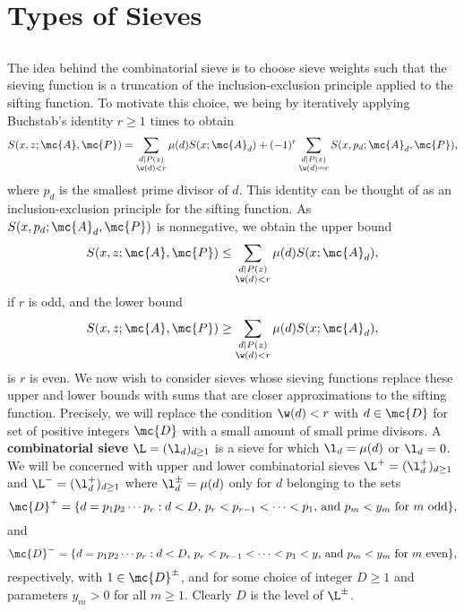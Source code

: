 \chapter{Types of Sieves}
  \section{}
    The idea behind the combinatorial sieve is to choose sieve weights such that the sieving function is a truncation of the inclusion-exclusion principle applied to the sifting function. To motivate this choice, we being by iteratively applying Buchstab's identity $r \ge 1$ times to obtain
    \[
      S(x,z;\mc{A},\mc{P}) = \sum_{\substack{d \mid P(z) \\ \w(d) < r}}\mu(d)S(x;\mc{A}_{d})+(-1)^{r}\sum_{\substack{d \mid P(z) \\ \w(d) = r}}S(x,p_{d};\mc{A}_{d},\mc{P}),
    \]
    where $p_{d}$ is the smallest prime divisor of $d$. This identity can be thought of as an inclusion-exclusion principle for the sifting function. As $S(x,p_{d};\mc{A}_{d},\mc{P})$ is nonnegative, we obtain the upper bound
    \[
      S(x,z;\mc{A},\mc{P}) \le \sum_{\substack{d \mid P(z) \\ \w(d) < r}}\mu(d)S(x;\mc{A}_{d}),
    \]
    if $r$ is odd, and the lower bound
    \[
      S(x,z;\mc{A},\mc{P}) \ge \sum_{\substack{d \mid P(z) \\ \w(d) < r}}\mu(d)S(x;\mc{A}_{d}),
    \]
    is $r$ is even. We now wish to consider sieves whose sieving functions replace these upper and lower bounds with sums that are closer approximations to the sifting function. Precisely, we will replace the condition $\w(d) < r$ with $d \in \mc{D}$ for set of positive integers $\mc{D}$ with a small amount of small prime divisors. A \textbf{combinatorial sieve} $\L = (\l_{d})_{d \ge 1}$ is a sieve for which $\l_{d} = \mu(d)$ or $\l_{d} = 0$. We will be concerned with upper and lower combinatorial sieves $\L^{+} = (\l_{d}^{+})_{d \ge 1}$ and $\L^{-} = (\l_{d}^{+})_{d \ge 1}$ where $\l_{d}^{\pm} = \mu(d)$ only for $d$ belonging to the sets
    \[
      \mc{D}^{+} = \{d = p_{1}p_{2} \cdots p_{r}:\text{$d < D$, $p_{r} < p_{r-1} < \cdots < p_{1}$, and $p_{m} < y_{m}$ for $m$ odd}\},
    \]
    and
    \[
      \mc{D}^{-} = \{d = p_{1}p_{2} \cdots p_{r}:\text{$d < D$, $p_{r} < p_{r-1} < \cdots < p_{1} < y$, and $p_{m} < y_{m}$ for $m$ even}\},
    \]
    respectively, with $1 \in \mc{D}^{\pm}$, and for some choice of integer $D \ge 1$ and parameters $y_{m} > 0$ for all $m \ge 1$. Clearly $D$ is the level of $\L^{\pm}$.
  \section{}
  \section{}